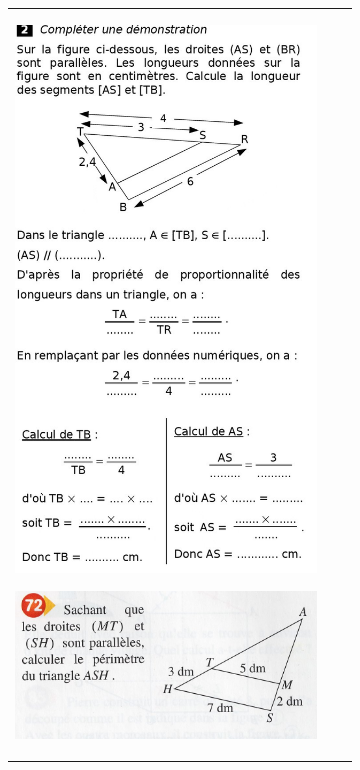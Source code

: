\documentclass[12pt, twoside]{article}
\begin{document}
\pagebreak


\begin{landscape}
\begin{tabular}{ccc}
\begin{minipage}{8cm}
\includegraphics[width=8cm]{images/ex2.jpg}

\bigskip

\includegraphics[width=8cm]{images/ex72.jpg}


\end{minipage}
\end{tabular}
\end{landscape}
\end{document}
